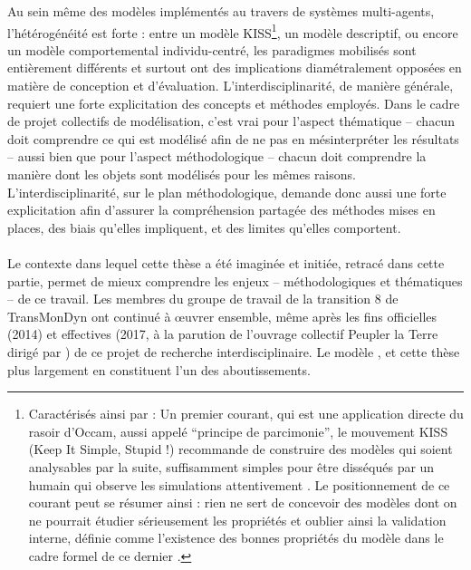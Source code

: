 Au sein même des modèles implémentés au travers de systèmes multi-agents, l'hétérogénéité est forte : entre un modèle KISS\footnote{
	Caractérisés ainsi par \textcite[110]{amblard_evaluation_2006} : 
	\og Un premier courant, qui est une application directe du rasoir d'Occam, aussi appelé ``principe de parcimonie'', le mouvement KISS (Keep It Simple, Stupid !) recommande de construire des modèles qui soient analysables par la suite, suffisamment simples pour être disséqués par un humain qui observe les simulations attentivement \textelp{}.
	Le positionnement de ce courant peut se résumer ainsi : rien ne sert de concevoir des modèles dont on ne pourrait étudier sérieusement les propriétés et oublier ainsi la validation interne, définie comme l'existence des bonnes propriétés du modèle dans le cadre formel de ce dernier
	\fg{}.
}, un modèle descriptif, ou encore un modèle comportemental individu-centré, les paradigmes mobilisés sont entièrement différents et surtout ont des implications diamétralement opposées en matière de conception et d'évaluation.
L'interdisciplinarité, de manière générale, requiert une forte explicitation des concepts et méthodes employés.
Dans le cadre de projet collectifs de modélisation, c'est vrai pour l'aspect thématique -- chacun doit comprendre ce qui est modélisé afin de ne pas en mésinterpréter les résultats -- aussi bien que pour l'aspect méthodologique -- chacun doit comprendre la manière dont les objets sont modélisés pour les mêmes raisons.
L'interdisciplinarité, sur le plan méthodologique, demande donc aussi une forte explicitation afin d'assurer la compréhension partagée des méthodes mises en places, des biais qu'elles impliquent, et des limites qu'elles comportent.

%

\bigskip
\paragraph[Conclusion intermédiaire]{}

Le contexte dans lequel cette thèse a été imaginée et initiée, retracé dans cette partie, permet de mieux comprendre les enjeux -- méthodologiques et thématiques -- de ce travail.
Les membres du groupe de travail de la \og transition 8\fg{} de TransMonDyn ont continué à œuvrer ensemble, même après les fins officielles (2014) et effectives (2017, à la parution de l'ouvrage collectif \og Peupler la Terre\fg{} dirigé par \textcite{sanders2018peupler}) de ce projet de recherche interdisciplinaire.
Le modèle \simfeodal{}, et cette thèse plus largement en constituent l'un des aboutissements.

